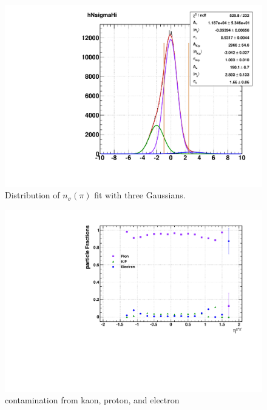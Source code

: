 \documentclass[abstract = on,listof=totoc, bibliography=totoc]{scrreprt}
\newcommand{\nsigpi}{n_\sigma(\pi)}
\begin{document}
\begin{figure}
\begin{center}
\includegraphics[width = 1\textwidth]{nSigma_05_1}
\caption[$\nsigpi$ distribution and tripple Gaussian fit]{Distribution of $\nsigpi$ fit with three Gaussians.}
\label{fig:nSigPiCut}
\end{center}
\end{figure}

\begin{figure}
\begin{center}
\includegraphics[width = 1\textwidth]{nSigmaVsEta_witherrors.pdf}
\caption[Contamination of pion sample]{contamination from kaon, proton, and electron}
\label{fig:contamination}
\end{center}
\end{figure}
\end{document}
